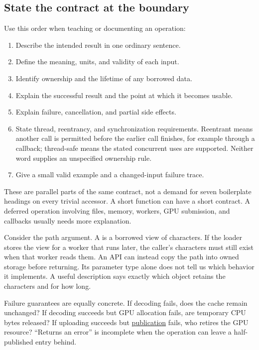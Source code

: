 \subsection{State the contract at the boundary}\label{01-foundations-i-ch008-state-the-contract-at-the-boundary}

\hypertarget{01-foundations-i-ch008-state-the-contract-at-the-boundary}{}

Use this order when teaching or documenting an operation:

\begin{enumerate}
\def\labelenumi{\arabic{enumi}.}
\tightlist
\item
  Describe the intended result in one ordinary sentence.
\item
  Define the meaning, units, and validity of each input.
\item
  Identify ownership and the lifetime of any borrowed data.
\item
  Explain the successful result and the point at which it becomes usable.
\item
  Explain failure, cancellation, and partial side effects.
\item
  State thread, reentrancy, and synchronization requirements. Reentrant means another call is permitted before the earlier call finishes, for example through a callback; thread-safe means the stated concurrent uses are supported. Neither word supplies an unspecified ownership rule.
\item
  Give a small valid example and a changed-input failure trace.
\end{enumerate}

These are parallel parts of the same contract, not a demand for seven boilerplate headings on every trivial accessor. A short function can have a short contract. A deferred operation involving files, memory, workers, GPU submission, and callbacks usually needs more explanation.

Consider the path argument. A  is a borrowed view of characters. If the loader stores the view for a worker that runs later, the caller's characters must still exist when that worker reads them. An API can instead copy the path into owned storage before returning. Its parameter type alone does not tell us which behavior it implements. A useful description says exactly which object retains the characters and for how long.

Failure guarantees are equally concrete. If decoding fails, does the cache remain unchanged? If decoding succeeds but GPU allocation fails, are temporary CPU bytes released? If uploading succeeds but \hyperref[appendix-fdae7ff0a23f]{publication} fails, who retires the GPU resource? ``Returns an error'' is incomplete when the operation can leave a half-published entry behind.

